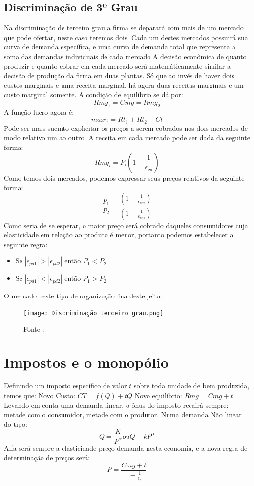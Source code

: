 \documentclass[12pt,a4paper,oneside,brazil]{abntex2}
\begin{document}
\subsection{Discriminação de 3º Grau}
Na discriminação de terceiro grau a firma se deparará com mais de um mercado que pode ofertar, neste caso teremos dois. Cada um destes mercados possuirá sua curva de demanda específica, e uma curva de demanda total que representa a soma das demandas individuais de cada mercado A decisão econômica de quanto produzir e quanto cobrar em cada mercado será matemáticamente similar a decisão de produção da firma em duas plantas. Só que ao invés de haver dois custos marginais e uma receita marginal, há agora duas receitas marginais e um custo marginal somente. A condição de equilíbrio se dá por:
\[ Rmg_1 = Cmg = Rmg_2 \]
A função lucro agora é:
\[ max \pi = Rt_1 + Rt_2 - Ct \]
Pode ser mais sucinto explicitar os preços a serem cobrados nos dois mercados de modo relativo um ao outro. A receita em cada mercado pode ser dada da seguinte forma:
\[ Rmg_i = P_i (1- \frac{1}{\epsilon_{pd}}) \]
Como temos dois mercados, podemos expressar seus preços relativos da seguinte forma:
\[ \frac{P_1}{P_2} = \frac{(1-\frac{1}{\epsilon_{pd2}})}{(1- \frac{1}{\epsilon_{pd1}})} \]
Como seria de se esperar, o maior preço será cobrado daqueles consumidores cuja elasticidade em relação ao produto é menor, portanto podemos estabelecer a seguinte regra:
\begin{itemize}
\item Se $ |\epsilon_{pd1}| > |\epsilon_{pd2}|$ então $ P_1 < P_2$
\item Se $ |\epsilon_{pd1}| < |\epsilon_{pd2}|$ então $ P_1 > P_2$
\end{itemize}
O mercado neste tipo de organização fica deste jeito:
\begin{figure}[h]
\texttt{[image: Discriminação terceiro grau.png]}
\centering
\caption{Fonte : \cite[p. 402]{pindyck}}
\end{figure}

\section{Impostos e o monopólio}
Definindo um imposto específico de valor $t$ sobre toda unidade de bem produzida, temos que: \newline
Novo Custo: $CT = f(Q) + t Q$ \newline
Novo equilíbrio: $Rmg = Cmg + t$ \newline
Levando em conta uma demanda linear, o ônus do imposto recairá sempre: metade com o consumidor, metade com o produtor. Numa demanda Não linear do tipo:
\[ Q = \frac{K}{P^\alpha} ou Q - k P^\alpha \]
Alfa será sempre a elasticidade preço demanda nesta economia, e a nova regra de determinação de preços será:
\[ P = \frac{Cmg + t}{1 - \frac{1}{\epsilon_p}}\]
\end{document}
